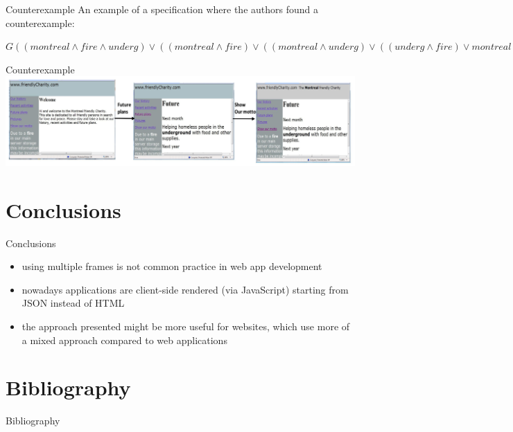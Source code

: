 \documentclass[usenames,dvipsnames]{beamer}
\theoremstyle{definition}
\begin{document}
\begin{frame}{Counterexample}
  An example of a specification where the authors found a counterexample:

  \begin{example}
    \begin{math}
      G((montreal\land fire\land underg)\lor((montreal\land fire)\lor((montreal\land underg)\lor((underg\land fire)\lor montreal\lor underg\lor fire))))
    \end{math}
  \end{example}
\end{frame}

\begin{frame}{Counterexample}
  \includegraphics[width=\textwidth]{../img/counterexample.png}
\end{frame}

\section{Conclusions}

\begin{frame}{Conclusions}
  \begin{itemize}
    \item using multiple frames is not common practice in web app development
    \item nowadays applications are client-side rendered (via JavaScript) starting from JSON instead of HTML 
    \item the approach presented might be more useful for websites, which use more of a mixed approach compared to web applications
  \end{itemize}
\end{frame}

\section{Bibliography}

\begin{frame}[t,allowframebreaks]{Bibliography}
  \nocite{*} %
  \printbibliography
\end{frame}
\end{document}
